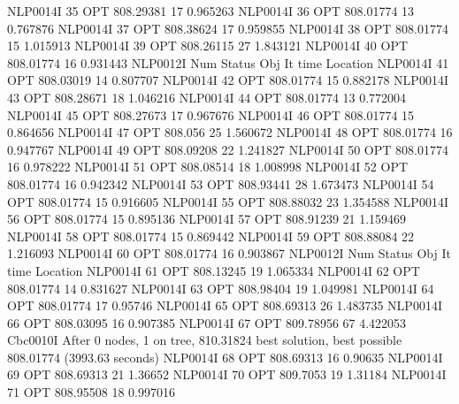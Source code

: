 NLP0014I            35         OPT 808.29381       17 0.965263
NLP0014I            36         OPT 808.01774       13 0.767876
NLP0014I            37         OPT 808.38624       17 0.959855
NLP0014I            38         OPT 808.01774       15 1.015913
NLP0014I            39         OPT 808.26115       27 1.843121
NLP0014I            40         OPT 808.01774       16 0.931443
NLP0012I 
              Num      Status      Obj             It       time                 Location
NLP0014I            41         OPT 808.03019       14 0.807707
NLP0014I            42         OPT 808.01774       15 0.882178
NLP0014I            43         OPT 808.28671       18 1.046216
NLP0014I            44         OPT 808.01774       13 0.772004
NLP0014I            45         OPT 808.27673       17 0.967676
NLP0014I            46         OPT 808.01774       15 0.864656
NLP0014I            47         OPT 808.056       25 1.560672
NLP0014I            48         OPT 808.01774       16 0.947767
NLP0014I            49         OPT 808.09208       22 1.241827
NLP0014I            50         OPT 808.01774       16 0.978222
NLP0014I            51         OPT 808.08514       18 1.008998
NLP0014I            52         OPT 808.01774       16 0.942342
NLP0014I            53         OPT 808.93441       28 1.673473
NLP0014I            54         OPT 808.01774       15 0.916605
NLP0014I            55         OPT 808.88032       23 1.354588
NLP0014I            56         OPT 808.01774       15 0.895136
NLP0014I            57         OPT 808.91239       21 1.159469
NLP0014I            58         OPT 808.01774       15 0.869442
NLP0014I            59         OPT 808.88084       22 1.216093
NLP0014I            60         OPT 808.01774       16 0.903867
NLP0012I 
              Num      Status      Obj             It       time                 Location
NLP0014I            61         OPT 808.13245       19 1.065334
NLP0014I            62         OPT 808.01774       14 0.831627
NLP0014I            63         OPT 808.98404       19 1.049981
NLP0014I            64         OPT 808.01774       17 0.95746
NLP0014I            65         OPT 808.69313       26 1.483735
NLP0014I            66         OPT 808.03095       16 0.907385
NLP0014I            67         OPT 809.78956       67 4.422053
Cbc0010I After 0 nodes, 1 on tree, 810.31824 best solution, best possible 808.01774 (3993.63 seconds)
NLP0014I            68         OPT 808.69313       16 0.90635
NLP0014I            69         OPT 808.69313       21 1.36652
NLP0014I            70         OPT 809.7053       19 1.31184
NLP0014I            71         OPT 808.95508       18 0.997016
